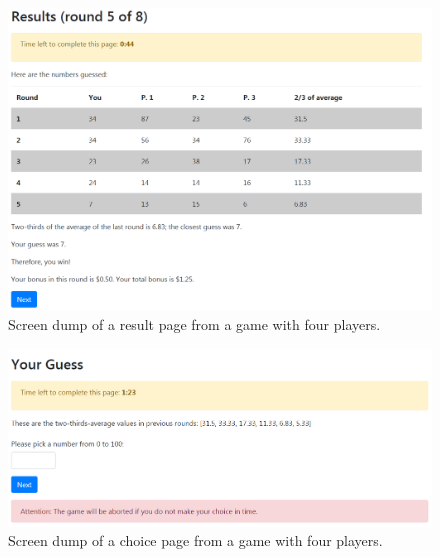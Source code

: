 \begin{figure}
\includegraphics[width=1\textwidth]{../images/FigA3.png}\caption{Screen dump of a result page from a game with four players.}
\label{Fig S3}
\end{figure}

\begin{figure}
\includegraphics[width=1\textwidth]{../images/FigA4.png}\caption{Screen dump of a choice page from a game with four players.}
\label{Fig S4}
\end{figure}

